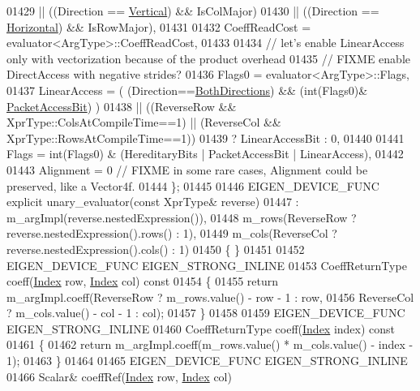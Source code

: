 \begin{DoxyCode}
01429                     || ((Direction == \hyperlink{group__enums_ggad49a7b3738e273eb00932271b36127f7addca718e0564723df21d61b94b1198be}{Vertical})   && IsColMajor)
01430                     || ((Direction == \hyperlink{group__enums_ggad49a7b3738e273eb00932271b36127f7aae8a16b3b9272683c1162915f6d892be}{Horizontal}) && IsRowMajor),
01431                     
01432     CoeffReadCost = evaluator<ArgType>::CoeffReadCost,
01433     
01434     \textcolor{comment}{// let's enable LinearAccess only with vectorization because of the product overhead}
01435     \textcolor{comment}{// FIXME enable DirectAccess with negative strides?}
01436     Flags0 = evaluator<ArgType>::Flags,
01437     LinearAccess = ( (Direction==\hyperlink{group__enums_ggad49a7b3738e273eb00932271b36127f7aa01e40fce022901560ce6d9fdee2fde3}{BothDirections}) && (int(Flags0)&
      \hyperlink{group__flags_ga1a306a438e1ab074e8be59512e887b9f}{PacketAccessBit}) )
01438                   || ((ReverseRow && XprType::ColsAtCompileTime==1) || (ReverseCol && 
      XprType::RowsAtCompileTime==1))
01439                  ? LinearAccessBit : 0,
01440 
01441     Flags = \textcolor{keywordtype}{int}(Flags0) & (HereditaryBits | PacketAccessBit | LinearAccess),
01442     
01443     Alignment = 0 \textcolor{comment}{// FIXME in some rare cases, Alignment could be preserved, like a Vector4f.}
01444   \};
01445 
01446   EIGEN\_DEVICE\_FUNC \textcolor{keyword}{explicit} unary\_evaluator(\textcolor{keyword}{const} XprType& reverse)
01447     : m\_argImpl(reverse.nestedExpression()),
01448       m\_rows(ReverseRow ? reverse.nestedExpression().rows() : 1),
01449       m\_cols(ReverseCol ? reverse.nestedExpression().cols() : 1)
01450   \{ \}
01451  
01452   EIGEN\_DEVICE\_FUNC EIGEN\_STRONG\_INLINE
01453   CoeffReturnType coeff(\hyperlink{namespace_eigen_a62e77e0933482dafde8fe197d9a2cfde}{Index} row, \hyperlink{namespace_eigen_a62e77e0933482dafde8fe197d9a2cfde}{Index} col)\textcolor{keyword}{ const}
01454 \textcolor{keyword}{  }\{
01455     \textcolor{keywordflow}{return} m\_argImpl.coeff(ReverseRow ? m\_rows.value() - row - 1 : row,
01456                            ReverseCol ? m\_cols.value() - col - 1 : col);
01457   \}
01458 
01459   EIGEN\_DEVICE\_FUNC EIGEN\_STRONG\_INLINE
01460   CoeffReturnType coeff(\hyperlink{namespace_eigen_a62e77e0933482dafde8fe197d9a2cfde}{Index} index)\textcolor{keyword}{ const}
01461 \textcolor{keyword}{  }\{
01462     \textcolor{keywordflow}{return} m\_argImpl.coeff(m\_rows.value() * m\_cols.value() - index - 1);
01463   \}
01464 
01465   EIGEN\_DEVICE\_FUNC EIGEN\_STRONG\_INLINE
01466   Scalar& coeffRef(\hyperlink{namespace_eigen_a62e77e0933482dafde8fe197d9a2cfde}{Index} row, \hyperlink{namespace_eigen_a62e77e0933482dafde8fe197d9a2cfde}{Index} col)

\end{DoxyCode}
